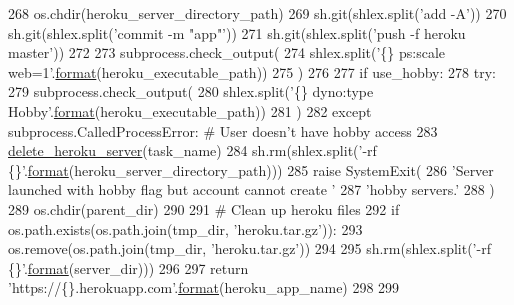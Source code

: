 \begin{DoxyCode}
268     os.chdir(heroku\_server\_directory\_path)
269     sh.git(shlex.split(\textcolor{stringliteral}{'add -A'}))
270     sh.git(shlex.split(\textcolor{stringliteral}{'commit -m "app"'}))
271     sh.git(shlex.split(\textcolor{stringliteral}{'push -f heroku master'}))
272 
273     subprocess.check\_output(
274         shlex.split(\textcolor{stringliteral}{'\{\} ps:scale web=1'}.\hyperlink{namespaceparlai_1_1chat__service_1_1services_1_1messenger_1_1shared__utils_a32e2e2022b824fbaf80c747160b52a76}{format}(heroku\_executable\_path))
275     )
276 
277     \textcolor{keywordflow}{if} use\_hobby:
278         \textcolor{keywordflow}{try}:
279             subprocess.check\_output(
280                 shlex.split(\textcolor{stringliteral}{'\{\} dyno:type Hobby'}.\hyperlink{namespaceparlai_1_1chat__service_1_1services_1_1messenger_1_1shared__utils_a32e2e2022b824fbaf80c747160b52a76}{format}(heroku\_executable\_path))
281             )
282         \textcolor{keywordflow}{except} subprocess.CalledProcessError:  \textcolor{comment}{# User doesn't have hobby access}
283             \hyperlink{namespaceparlai_1_1mturk_1_1core_1_1server__utils_a8dfde882f9d6ff492ca565ae2334fc70}{delete\_heroku\_server}(task\_name)
284             sh.rm(shlex.split(\textcolor{stringliteral}{'-rf \{\}'}.\hyperlink{namespaceparlai_1_1chat__service_1_1services_1_1messenger_1_1shared__utils_a32e2e2022b824fbaf80c747160b52a76}{format}(heroku\_server\_directory\_path)))
285             \textcolor{keywordflow}{raise} SystemExit(
286                 \textcolor{stringliteral}{'Server launched with hobby flag but account cannot create '}
287                 \textcolor{stringliteral}{'hobby servers.'}
288             )
289     os.chdir(parent\_dir)
290 
291     \textcolor{comment}{# Clean up heroku files}
292     \textcolor{keywordflow}{if} os.path.exists(os.path.join(tmp\_dir, \textcolor{stringliteral}{'heroku.tar.gz'})):
293         os.remove(os.path.join(tmp\_dir, \textcolor{stringliteral}{'heroku.tar.gz'}))
294 
295     sh.rm(shlex.split(\textcolor{stringliteral}{'-rf \{\}'}.\hyperlink{namespaceparlai_1_1chat__service_1_1services_1_1messenger_1_1shared__utils_a32e2e2022b824fbaf80c747160b52a76}{format}(server\_dir)))
296 
297     \textcolor{keywordflow}{return} \textcolor{stringliteral}{'https://\{\}.herokuapp.com'}.\hyperlink{namespaceparlai_1_1chat__service_1_1services_1_1messenger_1_1shared__utils_a32e2e2022b824fbaf80c747160b52a76}{format}(heroku\_app\_name)
298 
299 
\end{DoxyCode}
\mbox{\label{namespaceparlai_1_1mturk_1_1core_1_1dev_1_1server__utils_a914cced79fceeef08836d69d91e2d683}} 
